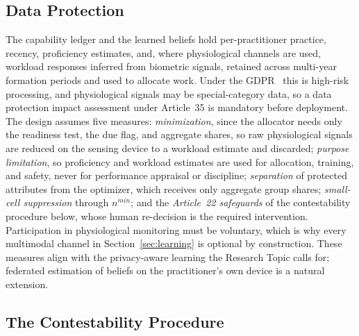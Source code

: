 \documentclass[utf8]{frontiers_suppmat}
\begin{document}
\subsection{Data Protection}
\label{app:dpia}

The capability ledger and the learned beliefs hold per-practitioner practice, recency, proficiency estimates, and, where physiological channels are used, workload responses inferred from biometric signals, retained across multi-year formation periods and used to allocate work. Under the GDPR~\citep{GDPR2016} this is high-risk processing, and physiological signals may be special-category data, so a data protection impact assessment under Article~35 is mandatory before deployment. The design assumes five measures: \textit{minimization}, since the allocator needs only the readiness test, the due flag, and aggregate shares, so raw physiological signals are reduced on the sensing device to a workload estimate and discarded; \textit{purpose limitation}, so proficiency and workload estimates are used for allocation, training, and safety, never for performance appraisal or discipline; \textit{separation} of protected attributes from the optimizer, which receives only aggregate group shares; \textit{small-cell suppression} through $n^{min}$; and the \textit{Article~22 safeguards} of the contestability procedure below, whose human re-decision is the required intervention. Participation in physiological monitoring must be voluntary, which is why every multimodal channel in Section~\ref{sec:learning} is optional by construction. These measures align with the privacy-aware learning the Research Topic calls for; federated estimation of beliefs on the practitioner's own device is a natural extension.

\subsection{The Contestability Procedure}
\label{app:contest}
\end{document}
